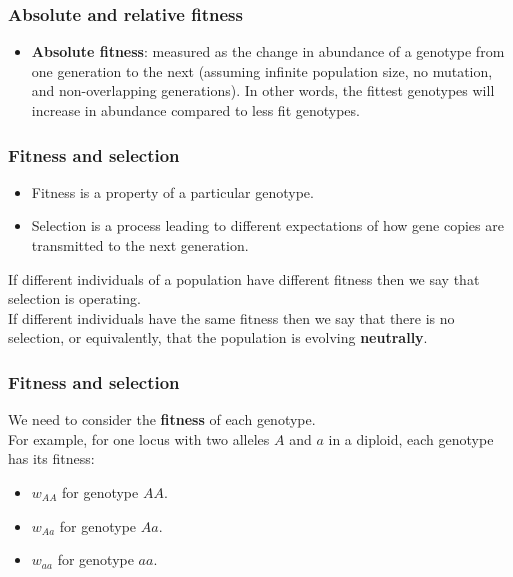 \documentclass{beamer}
\newcommand{\1}{\ensuremath{\mathbf{1}}}
\begin{document}
%
%
%
\begin{frame}\frametitle{Absolute and relative fitness}
	\begin{itemize}
		\item \textbf{Absolute fitness}: measured as the change in abundance of a genotype from one generation to the next (assuming infinite population size, no mutation, and non-overlapping generations). In other words, the fittest genotypes will increase in abundance compared to less fit genotypes.
	\end{itemize}
\end{frame}
%
%
%
\begin{frame}\frametitle{Fitness and selection}
	\begin{itemize}
		\item Fitness is a property of a particular genotype.
		\item Selection is a process leading to different expectations of how gene copies are transmitted to the next generation.
	\end{itemize}
	\vspace{2ex}If different individuals of a population have different fitness then we say that selection is operating.\\[2ex]
	If different individuals have the same fitness then we say that there is no selection, or equivalently, that the population is evolving \textbf{neutrally}.
\end{frame}
%
%
%
\begin{frame}\frametitle{Fitness and selection}
	We need to consider the \textbf{fitness} of each genotype.\\[2ex]
	For example, for one locus with two alleles $A$ and $a$ in a diploid, each genotype has its fitness:
	\begin{itemize}
		\item $w_{AA}$ for genotype $AA$.
		\item $w_{Aa}$ for genotype $Aa$.
		\item $w_{aa}$ for genotype $aa$.
	\end{itemize}
\end{frame}
\end{document}
